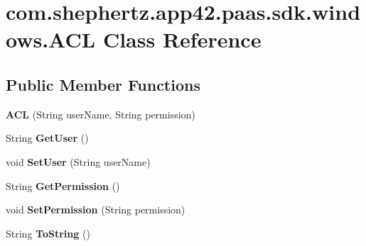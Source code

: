 \hypertarget{classcom_1_1shephertz_1_1app42_1_1paas_1_1sdk_1_1windows_1_1_a_c_l}{\section{com.\+shephertz.\+app42.\+paas.\+sdk.\+windows.\+A\+C\+L Class Reference}
\label{classcom_1_1shephertz_1_1app42_1_1paas_1_1sdk_1_1windows_1_1_a_c_l}
}
\subsection*{Public Member Functions}
\begin{DoxyCompactItemize}
\item 
\hypertarget{classcom_1_1shephertz_1_1app42_1_1paas_1_1sdk_1_1windows_1_1_a_c_l_a77819b88526ee4101312ea9a12dddae4}{{\bfseries A\+C\+L} (String user\+Name, String permission)}\label{classcom_1_1shephertz_1_1app42_1_1paas_1_1sdk_1_1windows_1_1_a_c_l_a77819b88526ee4101312ea9a12dddae4}

\item 
\hypertarget{classcom_1_1shephertz_1_1app42_1_1paas_1_1sdk_1_1windows_1_1_a_c_l_a35866b7de75bfda1f4b52aa0841a67af}{String {\bfseries Get\+User} ()}\label{classcom_1_1shephertz_1_1app42_1_1paas_1_1sdk_1_1windows_1_1_a_c_l_a35866b7de75bfda1f4b52aa0841a67af}

\item 
\hypertarget{classcom_1_1shephertz_1_1app42_1_1paas_1_1sdk_1_1windows_1_1_a_c_l_a240383ef438b23bf52a07845baae4bf1}{void {\bfseries Set\+User} (String user\+Name)}\label{classcom_1_1shephertz_1_1app42_1_1paas_1_1sdk_1_1windows_1_1_a_c_l_a240383ef438b23bf52a07845baae4bf1}

\item 
\hypertarget{classcom_1_1shephertz_1_1app42_1_1paas_1_1sdk_1_1windows_1_1_a_c_l_a8c27647ffbaf5ac144b63e9ecf016d95}{String {\bfseries Get\+Permission} ()}\label{classcom_1_1shephertz_1_1app42_1_1paas_1_1sdk_1_1windows_1_1_a_c_l_a8c27647ffbaf5ac144b63e9ecf016d95}

\item 
\hypertarget{classcom_1_1shephertz_1_1app42_1_1paas_1_1sdk_1_1windows_1_1_a_c_l_a3d6e6cffeb39e62d00b927330620a4b6}{void {\bfseries Set\+Permission} (String permission)}\label{classcom_1_1shephertz_1_1app42_1_1paas_1_1sdk_1_1windows_1_1_a_c_l_a3d6e6cffeb39e62d00b927330620a4b6}

\item 
\hypertarget{classcom_1_1shephertz_1_1app42_1_1paas_1_1sdk_1_1windows_1_1_a_c_l_a96c6b8f9f46b947d56a7f79228047aad}{String {\bfseries To\+String} ()}\label{classcom_1_1shephertz_1_1app42_1_1paas_1_1sdk_1_1windows_1_1_a_c_l_a96c6b8f9f46b947d56a7f79228047aad}


\end{DoxyCompactItemize}
